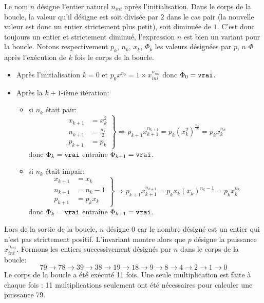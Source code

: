 Le nom $n$ désigne l'entier naturel $n_{ini}$ après l'initialisation. Dans le corps de la boucle, la valeur qu'il désigne est soit divisée par $2$ dans le cas pair (la nouvelle valeur est donc un entier strictement plus petit), soit diminuée de $1$. C'est donc toujours un entier et strictement diminué, l'expression $n$ est bien un variant pour la boucle.\newline
Notons respectivement $p_k$, $n_k$, $x_k$, $\Phi_k$ les valeurs désignées par $p$, $n$ $\Phi$ après l'exécution de $k$ fois le corps de la boucle.
\begin{itemize}
  \item Après l'initialisation $k=0$ et $p_0x^{n_0}=1\times x_{ini}^{n_{ini}}$ donc $\Phi_0 = \verb|vrai|$.
  \item Après la $k+1$-ième itération:
\begin{itemize}
  \item si $n_k$ était pair: 
\begin{displaymath}
\left. 
\begin{aligned}
  x_{k+1} &= x_k^2\\ n_{k+1} &= \frac{n_k}{2} \\ p_{k+1} &= p_k
\end{aligned}
\right\rbrace \Rightarrow
p_{k+1}x_{k+1}^{n_{k+1}}=p_k(x_k^2)^{\frac{n_k}{2}} = p_kx_k^{n_k}
\end{displaymath}
donc $\Phi_k=\verb|vrai|$ entraîne $\Phi_{k+1}=\verb|vrai|$.

  \item si $n_k$ était impair: 
\begin{displaymath}
\left. 
\begin{aligned}
  x_{k+1} &= x_k\\ n_{k+1} &= n_k-1 \\ p_{k+1} &= p_k x_k
\end{aligned}
\right\rbrace \Rightarrow
p_{k+1}x_{k+1}^{n_{k+1}}=p_k x_k(x_k)^{n_k -1} = p_kx_k^{n_k}
\end{displaymath}
donc $\Phi_k=\verb|vrai|$ entraîne $\Phi_{k+1}=\verb|vrai|$.
\end{itemize}
\end{itemize}
Lors de la sortie de la boucle, $n$ désigne $0$ car le nombre désigné est un entier qui n'est pas strictement positif. L'invariant montre alors que $p$ désigne la puissance $x_{ini}^{n_{ini}}$.\newline
Formons les entiers successivement désignés par $n$ dans le corps de la boucle:
\begin{displaymath}
  79 \rightarrow 78 \rightarrow 39 \rightarrow 38 \rightarrow 19 \rightarrow 18 \rightarrow 9 \rightarrow 8 \rightarrow 4 \rightarrow 2 \rightarrow 1 \rightarrow 0
\end{displaymath}
Le corps de la boucle a été exécuté 11 fois. Une seule multiplication est faite à chaque fois :  11 multiplications seulement ont été nécessaires pour calculer une puissance 79.